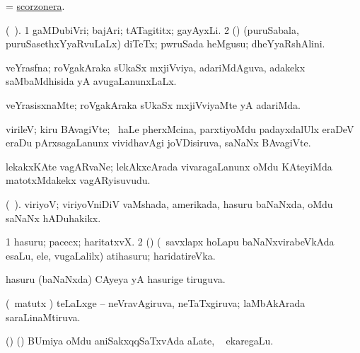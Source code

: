 \bentry
{}
\gl{\nA}
\expl{}
\bmng
 = \hyperref{kandict_s.pdf}{S}{scorzonera}{scorzonera}. 
\emng
\eentry

\bentry
{} 
\gl{\nA}(\bava\ ). 
\bmng
\bnum
\num{1} gaMDubiVri; bajAri; tATagititx; gayAyxLi. 
\num{2} (\pArxparx) (puruSabala, puruSasethxYyaRvuLaLx) diTeTx; pwruSada heMgusu; dheYyaRshAlini. 
\enum
\emng
\eentry

\bentry
{} 
\gl{\gu}
\expl{}
\bmng
veYrasfna; roVgakAraka sUkaSx mxjiVviya, adariMdAguva, adakekx saMbaMdhisida yA avugaLanunxLaLx. 
\emng
\eentry

\bentry 
{} 
\gl{\kirxvi}
\expl{}
\bmng
 veYrasisxnaMte; roVgakAraka sUkaSx mxjiVviyaMte yA adariMda. 
\emng
\eentry

\bentry
{} 
\gl{\nA}
\expl{}
\bmng
 virileV; kiru BAvagiVte; \kanmu\ haLe pherxMcina, parxtiyoMdu padayxdalUlx eraDeV eraDu pArxsagaLanunx vividhavAgi joVDisiruva, saNaNx BAvagiVte. 
\emng
\eentry

\bentry
{} 
\gl{\nA}
\expl{}
\bmng
 lekakxKAte vagARvaNe; lekAkxcArada vivaragaLanunx oMdu KAteyiMda matotxMdakekx vagARyisuvudu. 
\emng
\eentry

\bentry
{} 
\gl{\nA}(\bava\ ).
\bmng
 viriyoV; viriyoVniDiV vaMshada, amerikada, hasuru baNaNxda, oMdu saNaNx hADuhakikx.  
\emng
\eentry

\bentry
{} 
\gl{\nA}
\expl{}
\bmng
\bnum
\num{1} hasuru; pacecx; haritatxvX. 
\num{2} (\savi) (\sA\ savxlapx hoLapu baNaNxvirabeVkAda esaLu, ele, \mo vugaLalilx) atihasuru; haridatireVka. 
\enum
\emng
\eentry

\bentry
{} 
\gl{\gu}
\expl{}
\bmng
 hasuru (baNaNxda) CAyeya yA hasurige tiruguva. 
\emng
\eentry

\bentry
{} 
\gl{\gu}
\expl{}
\bmng
 (\savi\ matutx \pArxvi) teLaLxge -- neVravAgiruva, neTaTxgiruva; laMbAkArada saraLinaMtiruva. 
\emng
\eentry

\bentry
{} 
\gl{\nA}
\expl{}
\bmng
 (\birx) (\ca) BUmiya oMdu aniSakxqqSaTxvAda aLate, \kanmu\  ekaregaLu. 
\emng
\eentry

